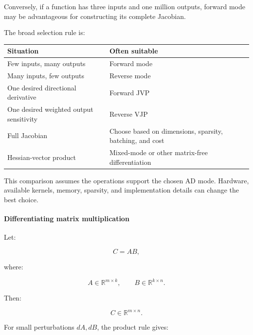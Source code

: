 Conversely, if a function has three inputs and one million outputs, forward mode may be advantageous for constructing its complete Jacobian.

The broad selection rule is:

{\def\LTcaptype{none} %
\begin{longtable}[]{@{}
  >{\raggedright\arraybackslash}p{}
  >{\raggedright\arraybackslash}p{}@{}}
\toprule\noalign{}
\begin{minipage}[b]{\linewidth}\raggedright
Situation
\end{minipage} & \begin{minipage}[b]{\linewidth}\raggedright
Often suitable
\end{minipage} \\
\midrule\noalign{}
\endhead
\bottomrule\noalign{}
\endlastfoot
Few inputs, many outputs & Forward mode \\
Many inputs, few outputs & Reverse mode \\
One desired directional derivative & Forward JVP \\
One desired weighted output sensitivity & Reverse VJP \\
Full Jacobian & Choose based on dimensions, sparsity, batching, and cost \\
Hessian-vector product & Mixed-mode or other matrix-free differentiation \\
\end{longtable}
}

This comparison assumes the operations support the chosen AD mode. Hardware, available kernels, memory, sparsity, and implementation details can change the best choice.

\paragraph{Differentiating matrix multiplication}\label{differentiating-matrix-multiplication}

Let:

\[
C=AB,
\]

where:

\[
A\in\mathbb R^{m\times k},\qquad B\in\mathbb R^{k\times n}.
\]

Then:

\[
C\in\mathbb R^{m\times n}.
\]

For small perturbations \(dA,dB\), the product rule gives:

